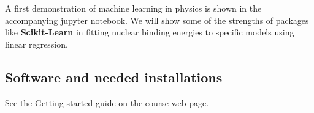 \documentclass[%
oneside,                 %
final,                   %
10pt]{article}
\begin{document}
A first demonstration of machine learning in physics is shown in the accompanying jupyter notebook. We will show some of the strengths of packages like \textbf{Scikit-Learn} in fitting nuclear binding energies to specific models using linear regression.

\subsection{Software and needed installations}

See the Getting started guide on the course web page.




\end{document}
